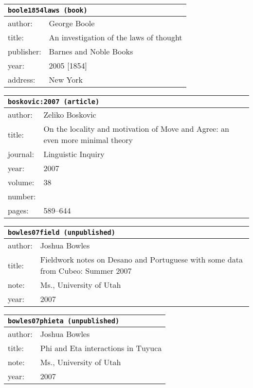 \documentclass{article}
\begin{document}
\bigskip

\begin{tabular}{p{}p{}}
\multicolumn{2}{l}{\texttt{boole1854laws (book)}}\\
\hline
author: & George Boole\\
title: & An investigation of the laws of thought\\
publisher: & Barnes and Noble Books\\
year: & 2005 [1854]\\
address: & New York\\
\end{tabular}

\bigskip

\begin{tabular}{p{}p{}}
\multicolumn{2}{l}{\texttt{boskovic:2007 (article)}}\\
\hline
author: & Zeliko Boskovic\\
title: & On the locality and motivation of \textsc{M}ove and \textsc{A}gree: an even more minimal theory\\
journal: & Linguistic Inquiry\\
year: & 2007\\
volume: & 38\\
number: & \\
pages: & 589--644\\
\end{tabular}

\bigskip

\begin{tabular}{p{}p{}}
\multicolumn{2}{l}{\texttt{bowles07field (unpublished)}}\\
\hline
author: & Joshua Bowles\\
title: & Fieldwork notes on \textsc{D}esano and \textsc{P}ortuguese with some data from \textsc{C}ubeo: Summer 2007\\
note: & \textsc{M}s., University of Utah\\
year: & 2007\\
\end{tabular}

\bigskip

\begin{tabular}{p{}p{}}
\multicolumn{2}{l}{\texttt{bowles07phieta (unpublished)}}\\
\hline
author: & Joshua Bowles\\
title: & Phi and \textsc{E}ta interactions in \textsc{T}uyuca\\
note: & \textsc{M}s., University of Utah\\
year: & 2007\\
\end{tabular}
\end{document}
